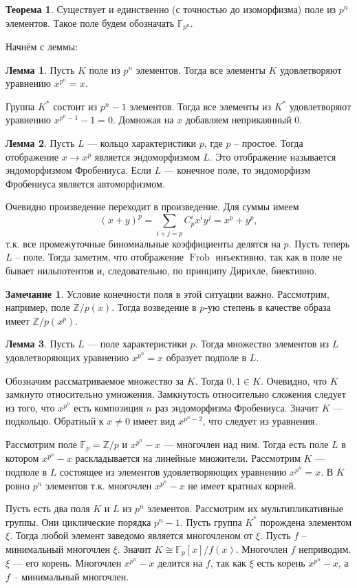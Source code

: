 \documentclass[12pt,a4paper,oneside]{book}
\theoremstyle{definition}
\newtheorem*{rem}{\color{green!50!blue}Замечание}
\newtheorem{thm}{\color{red!40!black}Теорема}
\newtheorem{lem}{\color{green!50!black}Лемма}
\newcommand{\Frob}{\operatorname{Frob}}
\newcommand{\Z}{\mathbb Z}
\newcommand{\F}{\mathbb F}
\def\thrm{\begin{thm}}
\def\ethrm{\end{thm}}
\def\lm{\begin{lem}}
\def\elm{\end{lem}}
\def\rm{\begin{rem}}
\def\erm{\end{rem}}
\begin{document}
\thrm Существует и единственно (с точностью до изоморфизма) поле из $p^n$ элементов. Такое поле будем обозначать $\F_{p^n}$.
\ethrm

Начнём с леммы:
\lm Пусть $K$ поле из $p^n$ элементов. Тогда все элементы $K$ удовлетворяют уравнению $x^{p^n}=x$.
\elm
\proof Группа $K^*$ состоит из $p^n-1$ элементов. Тогда все элементы из $K^*$ удовлетворяют уравнению $x^{p^n-1}-1=0$. Домножая на $x$ добавляем неприкаянный 0.
\endproof


\lm Пусть $L$ --- кольцо характеристики $p$, где $p$ -- простое. Тогда отображение $x\to x^{p}$ является эндоморфизмом $L$. Это отображение называется эндоморфизмом Фробениуса. Если $L$ --- конечное поле, то эндоморфизм Фробениуса является автоморфизмом. 
\elm
\proof Очевидно произведение переходит в произведение. Для суммы имеем $$(x+y)^p=\sum_{i+j=p} C_p^i x^iy^j= x^p+y^p,$$ т.к. все промежуточные биномиальные коэффициенты делятся на $p$. Пусть теперь $L$ -- поле. Тогда заметим, что отображение $\Frob$ инъективно, так как в поле не бывает нильпотентов и, следовательно, по принципу Дирихле, биективно.
\endproof

\rm Условие конечности поля в этой ситуации важно. Рассмотрим, например, поле $\Z/p(x)$. Тогда возведение в $p$-ую степень в качестве образа имеет $\Z/p(x^p)$.
\erm

\lm Пусть $L$ --- поле характеристики $p$. Тогда множество элементов из $L$ удовлетворяющих уравнению $x^{p^n}=x$ образует подполе в $L$.
\elm
\proof Обозначим рассматриваемое множество за $K$. Тогда $0,1\in K$. Очевидно, что $K$ замкнуто относительно умножения. Замкнутость относительно сложения следует из того, что $x^{p^n}$ есть композиция $n$ раз эндоморфизма Фробениуса. Значит $K$ --- подкольцо. Обратный к $x\neq 0$ имеет вид $x^{p^n-2}$, что следует из уравнения.
\endproof
 

Рассмотрим поле $\F_p=\Z/p$ и $x^{p^n}-x$ --- многочлен над ним. Тогда есть поле $L$ в котором   $x^{p^n}-x$ раскладывается на линейные множители. Рассмотрим $K$ --- подполе в $L$ состоящее из элементов удовлетворяющих уравнению $x^{p^n}=x$. В $K$ ровно $p^n$ элементов т.к. многочлен $x^{p^n}-x$ не имеет кратных корней.

Пусть есть два поля $K$ и $L$ из $p^n$ элементов. Рассмотрим их мультипликативные группы. Они циклические порядка $p^n-1$. Пусть группа $K^*$ порождена элементом $\xi$. Тогда любой элемент заведомо является многочленом от $\xi$. Пусть $f$ -- минимальный многочлен $\xi$. Значит $K\cong\F_p[x]/f(x)$. Многочлен $f$ неприводим. $\xi$ --- его корень. Многочлен $x^{p^n}-x$ делится на $f$, так как $\xi$ есть корень $x^{p^n}-x$, а $f$ -- минимальный многочлен.
\end{document}
